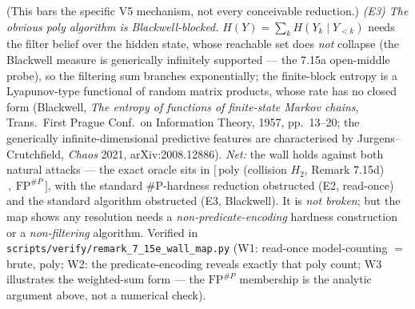 \documentclass[
]{article}
\begin{document}
(This bars the specific V5 mechanism, not every conceivable reduction.) \emph{(E3) The obvious
poly algorithm is Blackwell-blocked.} $H(Y)=\sum_k H(Y_k\mid Y_{<k})$ needs the filter
belief over the hidden state, whose reachable set does \emph{not} collapse (the
Blackwell measure is generically infinitely supported --- the 7.15a open-middle
probe), so the filtering sum branches exponentially; the finite-block entropy is a
Lyapunov-type functional of random matrix products, whose rate has no closed form
(Blackwell, \emph{The entropy of functions of finite-state Markov chains}, Trans.\
First Prague Conf.\ on Information Theory, 1957, pp.\ 13--20; the generically
infinite-dimensional predictive features are characterised by Jurgens--Crutchfield,
\emph{Chaos} 2021, arXiv:2008.12886). \emph{Net:} the wall
holds against both natural attacks --- the exact oracle sits in $[\,$poly (collision
$H_2$, Remark 7.15d)$\,,\ \mathrm{FP}^{\#P}\,]$, with the standard \#P-hardness
reduction obstructed (E2, read-once) and the standard algorithm obstructed (E3,
Blackwell). It is \emph{not broken}; but the map shows any resolution needs a
\emph{non-predicate-encoding} hardness construction or a \emph{non-filtering}
algorithm. Verified in \texttt{scripts/verify/remark\_7\_15e\_wall\_map.py} (W1:
read-once model-counting $=$ brute, poly; W2: the predicate-encoding reveals exactly
that poly count; W3 illustrates the weighted-sum form --- the
$\mathrm{FP}^{\#P}$ membership is the analytic argument above, not a numerical check).
\end{document}
